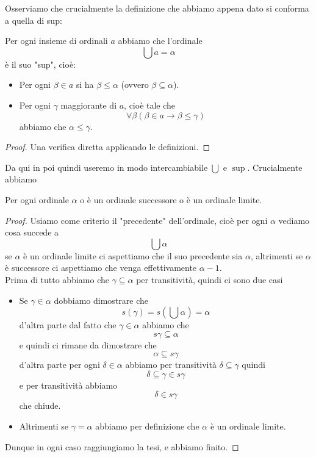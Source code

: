 \documentclass[11pt]{scrartcl}
\begin{document}
 	Osserviamo che crucialmente la definizione che abbiamo appena dato si conforma a quella di sup:
 	\begin{remark}
 		Per ogni insieme di ordinali $a$ abbiamo che l'ordinale
 		$$\bigcup a=\alpha$$
 		è il suo "sup", cioè:
 		\begin{itemize}
 			\item  Per ogni $\beta \in a$ si ha $\beta\le \alpha$ (ovvero $\beta\subseteq\alpha$).
 			\item Per ogni $\gamma$ maggiorante di $a$, cioè tale che 
 			$$\forall \beta\left(\beta\in a\to \beta \le \gamma \right)$$
 			abbiamo che $\alpha \le \gamma$. 
 		\end{itemize}
 	\end{remark}
 	\begin{proof}
 		Una verifica diretta applicando le definizioni.
 	\end{proof}
 	Da qui in poi quindi useremo in modo intercambiabile $\bigcup$ e $\sup$.
 	Crucialmente abbiamo
 	\begin{proposition}
 		Per ogni ordinale $\alpha$ o è un ordinale successore o è un ordinale limite.
 	\end{proposition}
 	\begin{proof}
 		Usiamo come criterio il "precedente" dell'ordinale, cioè per ogni $\alpha$ vediamo cosa succede a
 		$$\bigcup \alpha$$
 		se $\alpha$ è un ordinale limite ci aspettiamo che il suo precedente sia $\alpha$, altrimenti se $\alpha$ è successore ci aspettiamo che venga effettivamente $\alpha-1$. \\
 		Prima di tutto abbiamo che $\gamma \subseteq \alpha$ per transitività, quindi ci sono due casi
 		\begin{itemize}
 			\item Se $\gamma\in \alpha$ dobbiamo dimostrare che 
 			$$s(\gamma)=s\left(\bigcup \alpha\right)=\alpha$$
 			d'altra parte dal fatto che $\gamma\in \alpha$ abbiamo che 
 			$$s\gamma \subseteq \alpha$$
 			e quindi ci rimane da dimostrare che 
 			$$\alpha \subseteq s\gamma$$
 			d'altra parte per ogni $\delta\in \alpha$ abbiamo per transitività $\delta\subseteq \gamma$ quindi
 			$$\delta \subseteq \gamma \in s\gamma$$
 			e per transitività abbiamo
 			$$\delta \in s\gamma$$
 			che chiude.
 			\item Altrimenti se $\gamma=\alpha$ abbiamo per definizione che $\alpha$ è un ordinale limite.
 		\end{itemize}
 		Dunque in ogni caso raggiungiamo la tesi, e abbiamo finito.
 	\end{proof}
\end{document}
